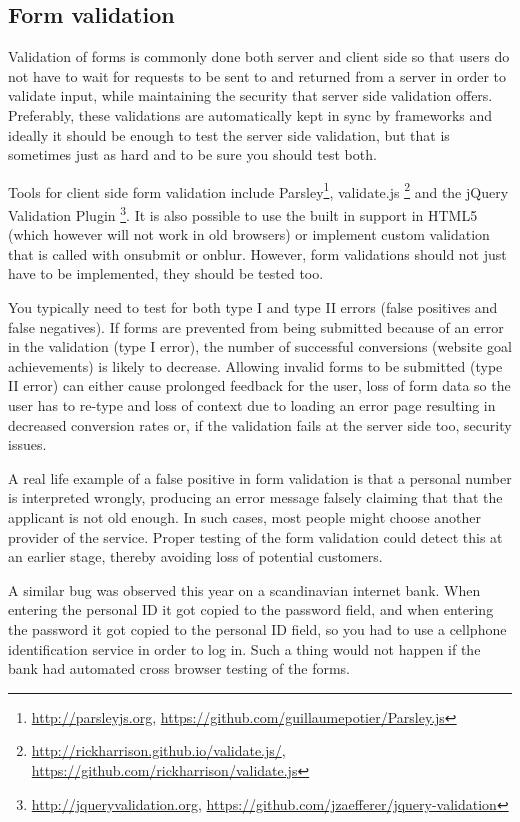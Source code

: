 \documentclass[11pt]{article}
\begin{document}
\subsection{Form validation}

Validation of forms is commonly done both server and client side so that users do not have to wait for requests to be sent to and returned from a server in order to validate input, while maintaining the security that server side validation offers. Preferably, these validations are automatically kept in sync by frameworks and ideally it should be enough to test the server side validation, but that is sometimes just as hard and to be sure you should test both.

Tools for client side form validation include Parsley\footnote{\url{http://parsleyjs.org}, \url{https://github.com/guillaumepotier/Parsley.js}}, validate.js \footnote{\url{http://rickharrison.github.io/validate.js/}, \url{https://github.com/rickharrison/validate.js}} and the jQuery Validation Plugin \footnote{\url{http://jqueryvalidation.org}, \url{https://github.com/jzaefferer/jquery-validation}}. It is also possible to use the built in support in HTML5 (which however will not work in old browsers) or implement custom validation that is called with onsubmit or onblur. However, form validations should not just have to be implemented, they should be tested too.

You typically need to test for both type I and type II errors (false positives and false negatives). If forms are prevented from being submitted because of an error in the validation (type I error), the number of successful conversions (website goal achievements) is likely to decrease. Allowing invalid forms to be submitted (type II error) can either cause prolonged feedback for the user, loss of form data so the user has to re-type and loss of context due to loading an error page resulting in decreased conversion rates or, if the validation fails at the server side too, security issues.

A real life example of a false positive in form validation is that a personal number is interpreted wrongly, producing an error message falsely claiming that that the applicant is not old enough. In such cases, most people might choose another provider of the service. Proper testing of the form validation could detect this at an earlier stage, thereby avoiding loss of potential customers. \cite{TwitterMe}

A similar bug was observed this year on a scandinavian internet bank. When entering the personal ID it got copied to the password field, and when entering the password it got copied to the personal ID field, so you had to use a cellphone identification service in order to log in. Such a thing would not happen if the bank had automated cross browser testing of the forms. \cite[question~38]{Ahnve}
\end{document}

